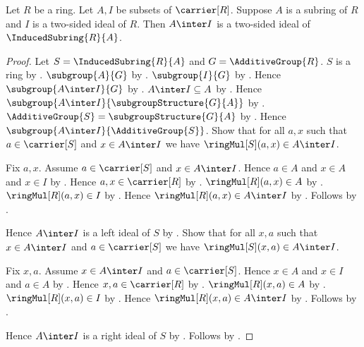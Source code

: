 \begin{theorem}\label{subring_intersection_ideal_in_induced_subring}
    Let $R$ be a ring.
    Let $A,I$ be subsets of $\carrier[R]$.
    Suppose $A$ is a subring of $R$ and $I$ is a two-sided ideal of $R$.
    Then $A\inter I$ is a two-sided ideal of $\InducedSubring{R}{A}$.
\end{theorem}
\begin{proof}
    Let $S=\InducedSubring{R}{A}$ and $G=\AdditiveGroup{R}$.
    $S$ is a ring by .
    $\subgroup{A}{G}$ by .
    $\subgroup{I}{G}$ by
        .
    Hence $\subgroup{A\inter I}{G}$ by .
    $A\inter I\subseteq A$ by .
    Hence $\subgroup{A\inter I}{\subgroupStructure{G}{A}}$ by
        .
    $\AdditiveGroup{S}=\subgroupStructure{G}{A}$ by
        .
    Hence $\subgroup{A\inter I}{\AdditiveGroup{S}}$.
    Show that for all $a,x$ such that $a\in\carrier[S]$ and
        $x\in A\inter I$ we have $\ringMul[S](a,x)\in A\inter I$.
    \begin{subproof}
        Fix $a,x$.
        Assume $a\in\carrier[S]$ and $x\in A\inter I$.
        Hence $a\in A$ and $x\in A$ and $x\in I$ by
            .
        Hence $a,x\in\carrier[R]$ by
            .
        $\ringMul[R](a,x)\in A$ by .
        $\ringMul[R](a,x)\in I$ by
            .
        Hence $\ringMul[R](a,x)\in A\inter I$ by .
        Follows by .
    \end{subproof}
    Hence $A\inter I$ is a left ideal of $S$ by
        .
    Show that for all $x,a$ such that $x\in A\inter I$ and
        $a\in\carrier[S]$ we have $\ringMul[S](x,a)\in A\inter I$.
    \begin{subproof}
        Fix $x,a$.
        Assume $x\in A\inter I$ and $a\in\carrier[S]$.
        Hence $x\in A$ and $x\in I$ and $a\in A$ by
            .
        Hence $x,a\in\carrier[R]$ by
            .
        $\ringMul[R](x,a)\in A$ by .
        $\ringMul[R](x,a)\in I$ by
            .
        Hence $\ringMul[R](x,a)\in A\inter I$ by .
        Follows by .
    \end{subproof}
    Hence $A\inter I$ is a right ideal of $S$ by
        .
    Follows by .
\end{proof}
